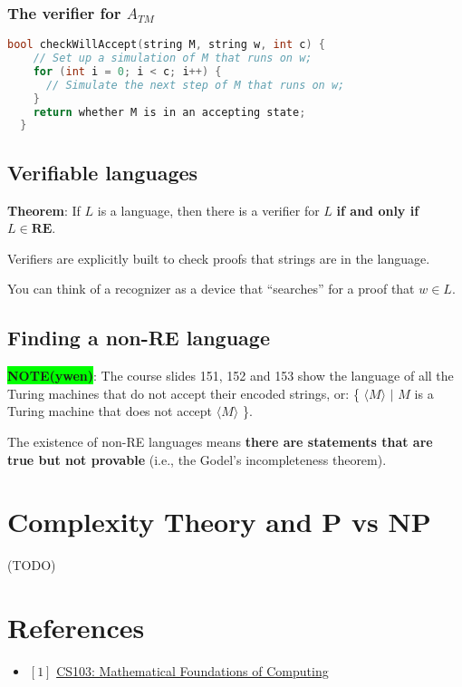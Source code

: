 \documentclass[12pt, letterpaper, oneside]{book}
\begin{document}
\subsection{The verifier for $A_{TM}$}

\begin{lstlisting}[language=C++]
  bool checkWillAccept(string M, string w, int c) {
    // Set up a simulation of M that runs on w;
    for (int i = 0; i < c; i++) {
      // Simulate the next step of M that runs on w;
    }
    return whether M is in an accepting state;
  }
\end{lstlisting}

\section{Verifiable languages}

\textbf{Theorem}: If $L$ is a language, then there is a verifier for $L$ \textbf{if and only if} $L \in \mathbf{RE}$.

Verifiers are explicitly built to check proofs that strings are in the language.

You can think of a recognizer as a device that ``searches'' for a proof that $w \in L$.

\section{Finding a non-RE language}

\colorbox{lime}{\textbf{NOTE(ywen)}}: The course slides 151, 152 and 153 show the language of all the Turing machines
that do not accept their encoded strings, or: \{ $\langle M \rangle$ $|$ $M$ is a Turing machine that does not accept
$\langle M \rangle$ \}.

The existence of non-RE languages means \textbf{there are statements that are true but not provable} (i.e., the Godel's
incompleteness theorem).

%
%

\chapter{Complexity Theory and P vs NP}

 (TODO)

\chapter*{References}

\begin{itemize}
  \item $[1]$ \href{https://web.stanford.edu/class/cs103/}{CS103: Mathematical Foundations of Computing}
\end{itemize}
\end{document}

